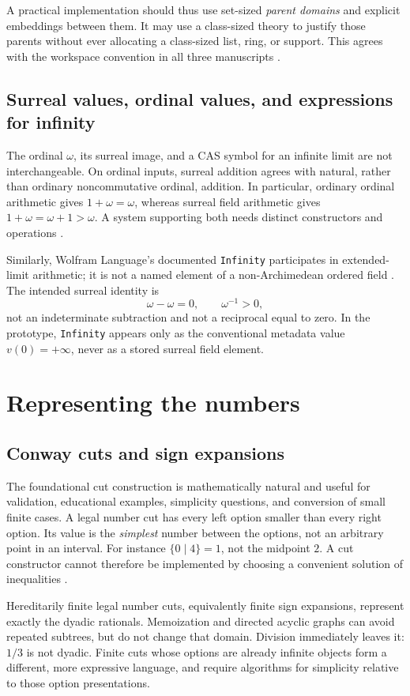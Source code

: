 \documentclass[11pt,letterpaper]{article}
\theoremstyle{definition}\newtheorem{definition}[theorem]{Definition}
\theoremstyle{remark}\newtheorem{remark}[theorem]{Remark}
\newcommand{\code}[1]{\texttt{#1}}
\numberwithin{equation}{section}\setcounter{tocdepth}{2}
\begin{document}
A practical implementation should thus use set-sized \emph{parent domains} and explicit embeddings between them. It may use a class-sized theory to justify those parents without ever allocating a class-sized list, ring, or support. This agrees with the workspace convention in all three manuscripts \cite{SA,AG,CT}.

\subsection{Surreal values, ordinal values, and expressions for infinity}
The ordinal $\omega$, its surreal image, and a CAS symbol for an infinite limit are not interchangeable. On ordinal inputs, surreal addition agrees with natural, rather than ordinary noncommutative ordinal, addition. In particular, ordinary ordinal arithmetic gives $1+\omega=\omega$, whereas surreal field arithmetic gives $1+\omega=\omega+1>\omega$. A system supporting both needs distinct constructors and operations \cite{Gonshor}.

Similarly, Wolfram Language's documented \code{Infinity} participates in extended-limit arithmetic; it is not a named element of a non-Archimedean ordered field \cite{WLInfinity}. The intended surreal identity is
\[
 \omega-\omega=0,\qquad \omega^{-1}>0,
\]
not an indeterminate subtraction and not a reciprocal equal to zero. In the prototype, \code{Infinity} appears only as the conventional metadata value $v(0)=+\infty$, never as a stored surreal field element.

\section{Representing the numbers}\label{sec:representations}
\subsection{Conway cuts and sign expansions}
The foundational cut construction is mathematically natural and useful for validation, educational examples, simplicity questions, and conversion of small finite cases. A legal number cut has every left option smaller than every right option. Its value is the \emph{simplest} number between the options, not an arbitrary point in an interval. For instance $\{0\mid4\}=1$, not the midpoint $2$. A cut constructor cannot therefore be implemented by choosing a convenient solution of inequalities \cite{Gonshor}.

Hereditarily finite legal number cuts, equivalently finite sign expansions, represent exactly the dyadic rationals. Memoization and directed acyclic graphs can avoid repeated subtrees, but do not change that domain. Division immediately leaves it: $1/3$ is not dyadic. Finite cuts whose options are already infinite objects form a different, more expressive language, and require algorithms for simplicity relative to those option presentations.
\end{document}
